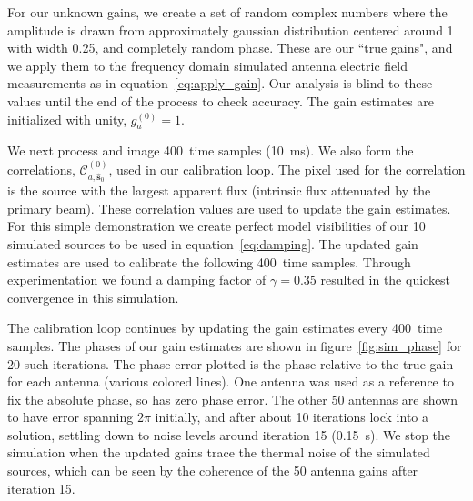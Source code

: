 \documentclass[a4paper,fleqn,usenatbib]{mnras}
\newcommand{\spix}{\ensuremath{\hat{\mathbf{s}}_{0}}}
\newcommand{\Cna}[1][n]{\ensuremath{\mathcal{C}^{(#1)}_{a,\spix}}}
\newcommand{\caliter}{400}
\newcommand{\damp}{\ensuremath{\gamma}}
\begin{document}
For our unknown gains, we create a set of random complex numbers where the amplitude is 
drawn from approximately gaussian distribution centered around 1 with width 0.25, and 
completely random phase. These are our ``true gains", and we apply them to the frequency
domain simulated antenna electric field measurements as in equation~\ref{eq:apply_gain}. Our analysis is 
blind to these values until the end of the process to check accuracy. The gain estimates are 
initialized with unity, $g^{(0)}_a=1$.

We next process and image \caliter~time samples (10~ms). We also form the correlations, 
\Cna[0], used in our calibration loop. The pixel used for the correlation is the source with the 
largest apparent flux (intrinsic flux attenuated by the primary beam). These correlation values 
are used to update the gain estimates. For this simple demonstration we create perfect model 
visibilities of our 10 simulated sources to be used in equation~\ref{eq:damping}. 
The updated gain estimates are used to calibrate the following 
\caliter~time samples. Through experimentation we found a damping factor of $\damp=0.35$ 
resulted in the quickest convergence in this simulation.

The calibration loop continues by updating the gain estimates every \caliter~time samples. The 
phases of our gain estimates are shown in figure~\ref{fig:sim_phase} for 20 such iterations. 
The phase error plotted is the phase relative to the true gain for each antenna (various colored 
lines). One antenna was used as a reference to fix the absolute phase, so has zero phase 
error. The other 50 antennas are shown to have error spanning $2\pi$ initially, and after about 
10 iterations lock into a solution, settling down to noise levels around iteration 15 (0.15~s). We 
stop the simulation when the updated gains trace the thermal noise of the simulated sources, 
which can be seen by the coherence of the 50 antenna gains after iteration 15.
\end{document}
